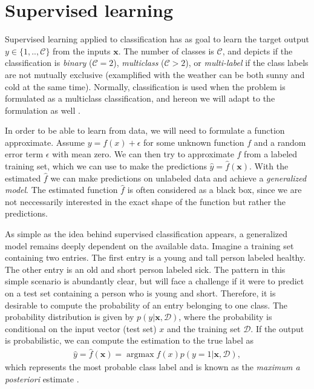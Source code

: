 
\section{Supervised learning}

Supervised learning applied to classification has as goal to learn the target output $y \in \{1,..,\mathcal{C}\}$ from the inputs $\boldsymbol{x}$. The number of classes is $\mathcal{C}$, and depicts if the classification is \textit{binary} ($\mathcal{C}=2$), \textit{multiclass} ($\mathcal{C}>2$), or \textit{multi-label} if the class labels are not mutually exclusive (examplified with the weather can be both sunny and cold at the same time). Normally, classification is used when the problem is formulated as a multiclass classification, and hereon we will adapt to the formulation as well \cite{Murphy2012}.

In order to be able to learn from data, we will need to formulate a function approximate. Assume $y = f(x) + \epsilon$ for some unknown function $f$ and a random error term $\epsilon$ with mean zero. We can then try to approximate $f$ from a labeled training set, which we can use to make the predictions $\hat{y}=\hat{f}(\boldsymbol{x})$. With the estimated $\hat{f}$ we can make predictions on unlabeled data and achieve a \textit{generalized model}. The estimated function $\hat{f}$ is often considered as a black box, since we are not neccessarily interested in the exact shape of the function but rather the predictions.

As simple as the idea behind supervised classification appears, a generalized model remains deeply dependent on the available data. Imagine a training set containing two entries. The first entry is a young and tall person labeled healthy. The other entry is an old and short person labeled sick. The pattern in this simple scenario is abundantly clear, but will face a challenge if it were to predict on a test set containing a person who is young and short. Therefore, it is desirable to compute the probability of an entry belonging to one class. The probability distribution is given by $p(y|\boldsymbol{x}, \mathcal{D})$, where the probability is conditional on the input vector (test set) $x$ and the training set $\mathcal{D}$. If the output is probabilistic, we can compute the estimation to the true label as
\begin{align}
  \hat{y} = \hat{f}(\boldsymbol{x}) = \operatorname*{argmax} f(x) p(y = 1|\boldsymbol{x}, \mathcal{D}),
\end{align}
which represents the most probable class label and is known as the \textit{maximum a posteriori} estimate \cite{Murphy2012}.

